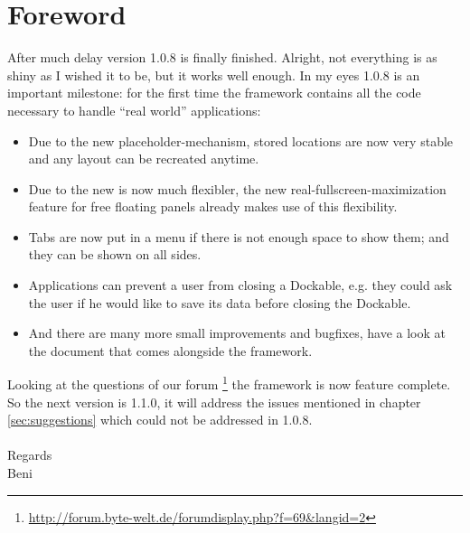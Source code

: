 \section{Foreword}
After much delay version 1.0.8 is finally finished. Alright, not everything is as shiny as I wished it to be, but it works well enough. In my eyes 1.0.8 is an important milestone: for the first time the framework contains all the code necessary to handle ``real world'' applications:
\begin{itemize}
 \item Due to the new placeholder-mechanism, stored locations are now very stable and any layout can be recreated anytime.
 \item Due to the new   is now much flexibler, the new real-fullscreen-maximization feature for free floating panels already makes use of this flexibility.
 \item Tabs are now put in a menu if there is not enough space to show them; and they can be shown on all sides.
 \item Applications can prevent a user from closing a Dockable, e.g. they could ask the user if he would like to save its data before closing the Dockable.
 \item And there are many more small improvements and bugfixes, have a look at the  document that comes alongside the framework.
\end{itemize}

Looking at the questions of our forum \footnote{\url{http://forum.byte-welt.de/forumdisplay.php?f=69&langid=2}} the framework is now feature complete. So the next version is 1.1.0, it will address the issues mentioned in chapter \ref{sec:suggestions} which could not be addressed in 1.0.8.\\
\\
Regards \\
Beni